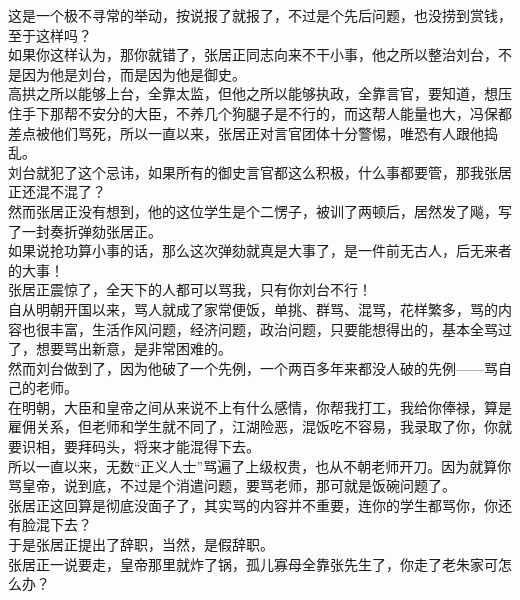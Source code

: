 \begin{multicols}{\theparacolNo}
这是一个极不寻常的举动，按说报了就报了，不过是个先后问题，也没捞到赏钱，至于这样吗？\\

如果你这样认为，那你就错了，张居正同志向来不干小事，他之所以整治刘台，不是因为他是刘台，而是因为他是御史。\\

高拱之所以能够上台，全靠太监，但他之所以能够执政，全靠言官，要知道，想压住手下那帮不安分的大臣，不养几个狗腿子是不行的，而这帮人能量也大，冯保都差点被他们骂死，所以一直以来，张居正对言官团体十分警惕，唯恐有人跟他捣乱。\\

刘台就犯了这个忌讳，如果所有的御史言官都这么积极，什么事都要管，那我张居正还混不混了？\\

然而张居正没有想到，他的这位学生是个二愣子，被训了两顿后，居然发了飚，写了一封奏折弹劾张居正。\\

如果说抢功算小事的话，那么这次弹劾就真是大事了，是一件前无古人，后无来者的大事！\\

张居正震惊了，全天下的人都可以骂我，只有你刘台不行！\\

自从明朝开国以来，骂人就成了家常便饭，单挑、群骂、混骂，花样繁多，骂的内容也很丰富，生活作风问题，经济问题，政治问题，只要能想得出的，基本全骂过了，想要骂出新意，是非常困难的。\\

然而刘台做到了，因为他破了一个先例，一个两百多年来都没人破的先例——骂自己的老师。\\

在明朝，大臣和皇帝之间从来说不上有什么感情，你帮我打工，我给你俸禄，算是雇佣关系，但老师和学生就不同了，江湖险恶，混饭吃不容易，我录取了你，你就要识相，要拜码头，将来才能混得下去。\\

所以一直以来，无数“正义人士”骂遍了上级权贵，也从不朝老师开刀。因为就算你骂皇帝，说到底，不过是个消遣问题，要骂老师，那可就是饭碗问题了。\\

张居正这回算是彻底没面子了，其实骂的内容并不重要，连你的学生都骂你，你还有脸混下去？\\

于是张居正提出了辞职，当然，是假辞职。\\

张居正一说要走，皇帝那里就炸了锅，孤儿寡母全靠张先生了，你走了老朱家可怎么办？\\


\end{multicols}
